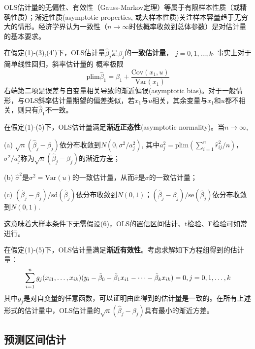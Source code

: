\par OLS估计量的无偏性、有效性（Gauss-Markov定理）等属于有限样本性质（或精确性质）；渐近性质(asymptotic properties, 或大样本性质)关注样本容量趋于无穷大的情形。经济学界认为一致性（$n\to \infty$时依概率收敛到总体参数）是对估计量的基本要求。

\par 在假定(1)-(3),(4')下，OLS估计量$\hat{\beta}_j$是${\beta}_j$的\textbf{一致估计量}， $j=0,1,\dots,k$. 事实上对于简单线性回归，斜率估计量的
概率极限\begin{equation}
    \text{plim}\hat{\beta}_1=\beta_1+\frac{\text{Cov}(x_1,u)}{\text{Var}(x_1)}
\end{equation}
右端第二项是误差与自变量相关导致的渐近偏误(asymptotic bias)。对于一般情形，与OLS斜率估计量期望的偏差类似，若$x_1$与$u$相关，其余变量与$x_1$和$u$都不相关，则只有$\hat{\beta}_1$不一致。

\par 在假定(1)-(5)下，OLS估计量满足\textbf{渐近正态性}(asymptotic normality)。当$n \to \infty$,
\par (a) $\sqrt{n}(\hat{\beta}_j-\beta_j)$依分布收敛到$N(0,\sigma^2/a_j^2)$, 其中$a_j^2=\text{plim}(\sum_{i=1}^n \hat{r}_{ij}^2/n)$，$\sigma^2/a_j^2$称为$\sqrt{n}(\hat{\beta}_j-\beta_j)$的渐近方差；
\par (b) $\hat{\sigma}^2$是$\sigma^2=\text{Var}(u)$的一致估计量，从而$\hat{\sigma}$是$\sigma$的一致估计量；
\par (c) $(\hat{\beta}_j-\beta_j)/\text{sd}(\hat{\beta}_j)$依分布收敛到$N(0,1)$；$(\hat{\beta}_j-\beta_j)/\text{se}(\hat{\beta}_j)$依分布收敛到$N(0,1)$.
\par 这意味着大样本条件下无需假设(6)，OLS的置信区间估计、t检验、F检验可如常进行。

\par 在假定(1)-(5)下，OLS估计量满足\textbf{渐近有效性}。考虑求解如下方程组得到的估计量：
\begin{equation}
    \sum_{i=1}^n g_j(x_{i1},\dots,x_{ik})(y_i-\Tilde{\beta}_0-\Tilde{\beta}_1x_{i1}-\dots-\Tilde{\beta}_kx_{ik})=0, j=0,1,\dots,k
\end{equation}
其中$g_j$是对自变量的任意函数，可以证明由此得到的估计量是一致的。在所有上述形式的估计量中，OLS估计量的$\sqrt{n}(\hat{\beta}_j-\beta_j)$具有最小的渐近方差。

\subsection{预测区间估计}

